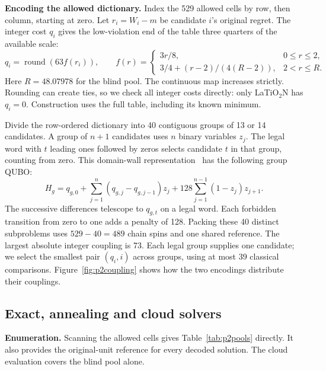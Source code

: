 \textbf{Encoding the allowed dictionary.} Index the 529 allowed cells by row, then column, starting at zero. Let $r_i=W_i-m$ be candidate $i$'s original regret. The integer cost $q_i$ gives the low-violation end of the table three quarters of the available scale:
\begin{equation}
 q_i=\operatorname{round}(63 f(r_i)),\qquad
 f(r)=\begin{cases} 3r/8, &0\le r\le2,\\
 3/4+(r-2)/(4(R-2)), &2<r\le R .
 \end{cases}\label{eq:p2shape}
\end{equation}\nopagebreak[4]
\noindent Here $R=48.07978$ for the blind pool. The continuous map increases strictly. Rounding can create ties, so we check all integer costs directly: only LaTiO$_2$N has $q_i=0$. Construction uses the full table, including its known minimum.

Divide the row-ordered dictionary into 40 contiguous groups of 13 or 14 candidates. A group of $n+1$ candidates uses $n$ binary variables $z_j$. The legal word with $t$ leading ones followed by zeros selects candidate $t$ in that group, counting from zero. This domain-wall representation~\cite{chancellor2019} has the following group QUBO:
\begin{equation}
 H_g=q_{g,0}+\sum_{j=1}^{n}(q_{g,j}-q_{g,j-1})z_j
       +128\sum_{j=1}^{n-1}(1-z_j)z_{j+1}.
 \label{eq:p2chain}
\end{equation}\nopagebreak[4]
\noindent The successive differences telescope to $q_{g,t}$ on a legal word. Each forbidden transition from zero to one adds a penalty of 128. Packing these 40 distinct subproblems uses $529-40=489$ chain spins and one shared reference. The largest absolute integer coupling is 73. Each legal group supplies one candidate; we select the smallest pair $(q_i,i)$ across groups, using at most 39 classical comparisons. Figure~\ref{fig:p2coupling} shows how the two encodings distribute their couplings.
\FloatBarrier

\subsection{Exact, annealing and cloud solvers}\label{sec:p2solve}
\textbf{Enumeration.} Scanning the allowed cells gives Table~\ref{tab:p2pools} directly. It also provides the original-unit reference for every decoded solution. The cloud evaluation covers the blind pool alone.

